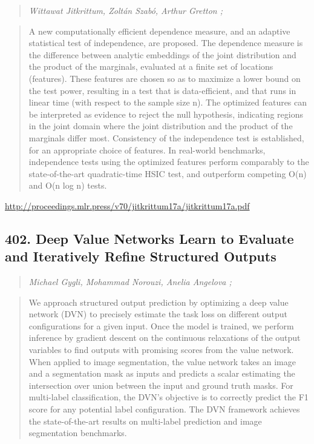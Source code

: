 \documentclass{article}
\begin{document}
\begin{quote}
\footnotesize{\textit{Wittawat Jitkrittum, Zoltán Szabó, Arthur Gretton ;}}

\end{quote}

\begin{quote}
    A new computationally efficient dependence measure, and an adaptive statistical test of independence, are proposed. The dependence measure is the difference between analytic embeddings of the joint distribution and the product of the marginals, evaluated at a finite set of locations (features). These features are chosen so as to maximize a lower bound on the test power, resulting in a test that is data-efficient, and that runs in linear time (with respect to the sample size n). The optimized features can be interpreted as evidence to reject the null hypothesis, indicating regions in the joint domain where the joint distribution and the product of the marginals differ most. Consistency of the independence test is established, for an appropriate choice of features. In real-world benchmarks, independence tests using the optimized features perform comparably to the state-of-the-art quadratic-time HSIC test, and outperform competing O(n) and O(n log n) tests.  
\end{quote}

\href{http://proceedings.mlr.press/v70/jitkrittum17a/jitkrittum17a.pdf}{http://proceedings.mlr.press/v70/jitkrittum17a/jitkrittum17a.pdf}

\subsection{402. Deep Value Networks Learn to Evaluate and Iteratively Refine Structured Outputs}

\begin{quote}
\footnotesize{\textit{Michael Gygli, Mohammad Norouzi, Anelia Angelova ;}}

\end{quote}

\begin{quote}
    We approach structured output prediction by optimizing a deep value network (DVN) to precisely estimate the task loss on different output configurations for a given input. Once the model is trained, we perform inference by gradient descent on the continuous relaxations of the output variables to find outputs with promising scores from the value network. When applied to image segmentation, the value network takes an image and a segmentation mask as inputs and predicts a scalar estimating the intersection over union between the input and ground truth masks. For multi-label classification, the DVN’s objective is to correctly predict the F1 score for any potential label configuration. The DVN framework achieves the state-of-the-art results on multi-label prediction and image segmentation benchmarks.  
\end{quote}
\end{document}
